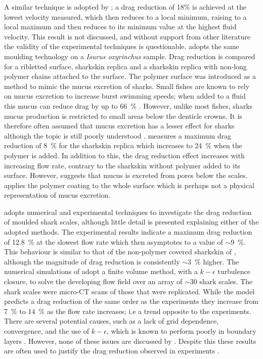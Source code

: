 \documentclass[12pt,oneside,a4paper]{article}
\begin{document}
A similar technique is adopted by \cite{zhao2012}; a drag reduction of 18\% is achieved at the lowest velocity measured, which then reduces to a local minimum, raising to a local maximum and then reduces to its minimum value at the highest fluid velocity. This result is not discussed, and without support from other literature the validity of the experimental techniques is questionable. \cite{zhang2011b} adopts the same moulding technology on a \textit{Isurus oxyrinchus} sample. Drag reduction is compared for a ribletted surface, sharkskin replica and a sharkskin replica with non-long polymer chains attached to the surface. The polymer surface was introduced as a method to mimic the mucus excretion of sharks. Small fishes are known to rely on mucus excretion to increase burst swimming speeds; when added to a fluid this mucus can reduce drag by up to \SI{66}{\%} \citep{fletcher2014phd}. However, unlike most fishes, sharks mucus production is restricted to small areas below the denticle crowns. It is therefore often assumed that mucus excretion has a lesser effect for sharks although the topic is still poorly understood \citep{fletcher2014phd}. %
\cite{zhang2011b} measures a maximum drag reduction of \SI{8}{\%} for the sharkskin replica which increases to \SI{24}{\%} when the polymer is added. In addition to this, the drag reduction effect increases with increasing flow rate, contrary to the sharkskin without polymer added to its surface. However, \cite{fletcher2014phd} suggests that mucus is excreted from pores below the scales. \cite{zhang2011b} applies the polymer coating to the whole surface which is perhaps not a physical representation of mucus excretion. 

\cite{zhang2011a} adopts numerical and experimental techniques to investigate the drag reduction of moulded shark scales, although little detail is presented explaining either of the adopted methods. The experimental results indicate a maximum drag reduction of \SI{12.8}{\%} at the slowest flow rate which then asymptotes to a value of $\sim$\SI{9}{\%}. This behaviour is similar to that of the non-polymer covered sharkskin of \cite{zhang2011b}, although the magnitude of drag reduction is consistently $\sim$\SI{3}{\%} higher. The numerical simulations of \cite{zhang2011a} adopt a finite volume method, with a $k-\epsilon$ turbulence closure, to solve the developing flow field over an array of $\sim$30 shark scales. The shark scales were micro-CT scans of those that were replicated. While the model predicts a drag reduction of the same order as the experiments they increase from \SI{7}{\%} to \SI{14}{\%} as the flow rate increases; i.e a trend opposite to the experiments. There are several potential causes, such as a lack of grid dependence, convergence, and the use of $k-\epsilon$, which is known to perform poorly in boundary layers \citep{pope2001}. However, none of these issues are discussed by \cite{zhang2011a}. Despite this these results are often used to justify the drag reduction observed in experiments \citep{zhao2012,chen2014}.
\end{document}
